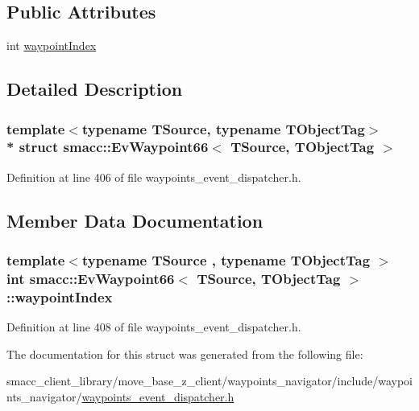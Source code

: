 \subsection*{Public Attributes}
\begin{DoxyCompactItemize}
\item 
int \hyperlink{structsmacc_1_1EvWaypoint66_a4023a42f2ef932c7085e1bff90aca41e}{waypoint\+Index}
\end{DoxyCompactItemize}


\subsection{Detailed Description}
\subsubsection*{template$<$typename T\+Source, typename T\+Object\+Tag$>$\\*
struct smacc\+::\+Ev\+Waypoint66$<$ T\+Source, T\+Object\+Tag $>$}



Definition at line 406 of file waypoints\+\_\+event\+\_\+dispatcher.\+h.



\subsection{Member Data Documentation}
\subsubsection[{\texorpdfstring{waypoint\+Index}{waypointIndex}}]{\setlength{\rightskip}{0pt plus 5cm}template$<$typename T\+Source , typename T\+Object\+Tag $>$ int {\bf smacc\+::\+Ev\+Waypoint66}$<$ T\+Source, T\+Object\+Tag $>$\+::waypoint\+Index}\hypertarget{structsmacc_1_1EvWaypoint66_a4023a42f2ef932c7085e1bff90aca41e}{}\label{structsmacc_1_1EvWaypoint66_a4023a42f2ef932c7085e1bff90aca41e}


Definition at line 408 of file waypoints\+\_\+event\+\_\+dispatcher.\+h.



The documentation for this struct was generated from the following file\+:\begin{DoxyCompactItemize}
\item 
smacc\+\_\+client\+\_\+library/move\+\_\+base\+\_\+z\+\_\+client/waypoints\+\_\+navigator/include/waypoints\+\_\+navigator/\hyperlink{waypoints__event__dispatcher_8h}{waypoints\+\_\+event\+\_\+dispatcher.\+h}\end{DoxyCompactItemize}
